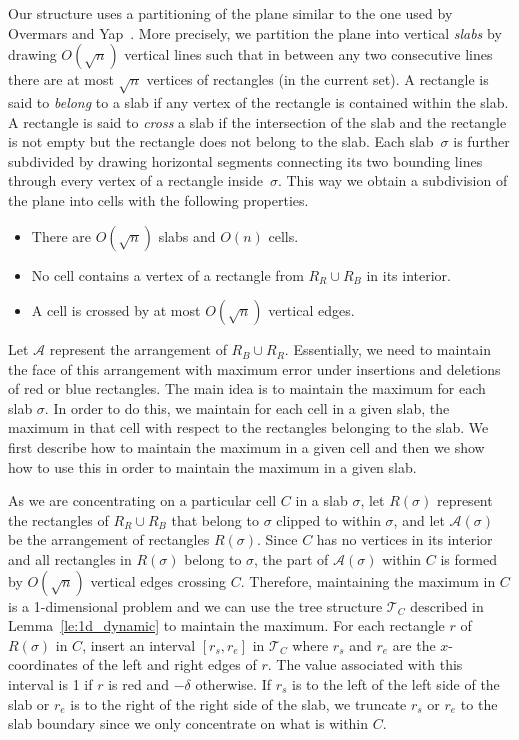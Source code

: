 \documentclass{elsart}
\newcommand{\A}{{\mathcal A}}
\newcommand{\tree}{{\mathcal T}}
\newcommand{\cell}{C}
\begin{document}
Our structure uses a partitioning of the plane similar to the one used
by Overmars and Yap~\cite{oy-nubkm-91}. More precisely, we partition
the plane into vertical \emph{slabs} by drawing
$O(\sqrt{n})$ vertical lines such that in between any two consecutive
lines there are at most $\sqrt{n}$ vertices of rectangles
(in the current set). A rectangle
is said to {\em belong} to a slab if any vertex of the rectangle is
contained within the slab. A rectangle is said to {\em cross} a slab
if the intersection of the slab and the rectangle is not empty but the
rectangle does not belong to the slab.  Each slab~$\sigma$ is further
subdivided by drawing horizontal segments connecting its two bounding
lines through every vertex of a rectangle inside~$\sigma$. This way we
obtain a subdivision of the plane into cells with the following
properties.
\begin{itemize}
\item There are $O(\sqrt{n})$ slabs and $O(n)$ cells.
\item No cell contains a vertex of a rectangle
      from $R_R\cup R_B$ in its interior.
\item A cell is crossed by at most $O(\sqrt{n})$ vertical edges.
\end{itemize}
Let $\A$ represent the arrangement of $R_B \cup R_R$. Essentially, we
need to maintain the face of this arrangement with maximum error under
insertions and deletions of red or blue rectangles. The main idea is
to maintain the maximum for each slab $\sigma$.  In order to do this,
we maintain for each cell in a given slab, the maximum in that cell
with respect to the rectangles belonging to the slab. We first
describe how to maintain the maximum in a given cell and then we show
how to use this in order to maintain the maximum in a given slab.

As we are concentrating on a particular cell $\cell$ in a slab
$\sigma$, let $R(\sigma)$ represent the rectangles of $R_R \cup R_B$
that belong to $\sigma$ clipped to within $\sigma$,
and let $\A(\sigma)$ be the arrangement of
rectangles $R(\sigma)$. Since $C$ has no vertices in its interior and
all rectangles in $R(\sigma)$ belong to $\sigma$, the part of
$\A(\sigma)$ within $C$ is formed by $O(\sqrt{n})$ vertical edges
crossing $C$.  Therefore, maintaining the maximum in $\cell$ is a
1-dimensional problem and we can use the tree structure $\tree_C$
described in Lemma~\ref{le:1d_dynamic} to maintain the maximum. For
each rectangle $r$ of $R(\sigma)$ in $C$, insert an interval
$[r_s,r_e]$ in $\tree_C$ where $r_s$ and $r_e$ are the $x$-coordinates
of the left and right edges of $r$. The value associated with this
interval is 1 if $r$ is red and $-\delta$ otherwise. If $r_s$ is to
the left of the left side of the slab or $r_e$ is to the right of the
right side of the slab, we truncate $r_s$ or $r_e$ to the slab
boundary since we only concentrate on what is within $\cell$.
\end{document}
